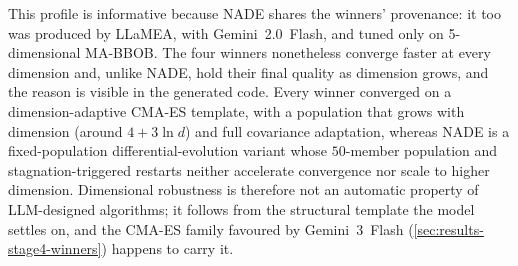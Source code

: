 This profile is informative because NADE shares the winners' provenance: it too was produced by LLaMEA, with Gemini~2.0~Flash, and tuned only on 5-dimensional MA-BBOB. The four winners nonetheless converge faster at every dimension and, unlike NADE, hold their final quality as dimension grows, and the reason is visible in the generated code. Every winner converged on a dimension-adaptive CMA-ES template, with a population that grows with dimension (around $4 + 3\ln d$) and full covariance adaptation, whereas NADE is a fixed-population differential-evolution variant whose $50$-member population and stagnation-triggered restarts neither accelerate convergence nor scale to higher dimension. Dimensional robustness is therefore not an automatic property of LLM-designed algorithms; it follows from the structural template the model settles on, and the CMA-ES family favoured by Gemini~3~Flash (\cref{sec:results-stage4-winners}) happens to carry it.
